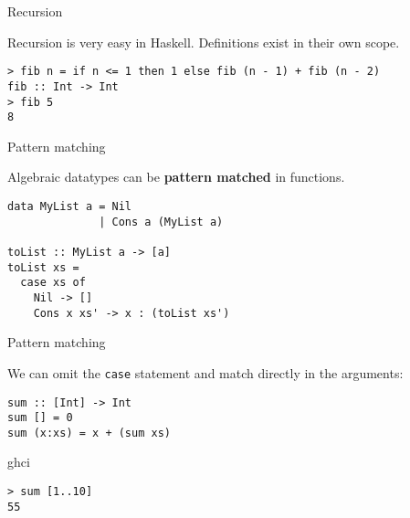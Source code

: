%
\begin{frame}[fragile]{Recursion}

Recursion is very easy in Haskell. Definitions exist in their own scope.

\begin{block}{}
\begin{verbatim}
> fib n = if n <= 1 then 1 else fib (n - 1) + fib (n - 2)
fib :: Int -> Int
> fib 5
8
\end{verbatim}
\end{block}

\end{frame}

%
\begin{frame}[fragile]{Pattern matching}

Algebraic datatypes can be \textbf{pattern matched} in functions.

\begin{block}{}
\begin{verbatim}
data MyList a = Nil
              | Cons a (MyList a)

toList :: MyList a -> [a]
toList xs = 
  case xs of
    Nil -> []
    Cons x xs' -> x : (toList xs')
\end{verbatim}
\end{block}

\end{frame}

%
\begin{frame}[fragile]{Pattern matching}

We can omit the \texttt{case} statement and match directly in the arguments:

\begin{block}{}
\begin{verbatim}
sum :: [Int] -> Int
sum [] = 0
sum (x:xs) = x + (sum xs)
\end{verbatim}
\end{block}

\begin{block}{ghci}
\begin{verbatim}
> sum [1..10]
55
\end{verbatim}
\end{block}

\end{frame}

